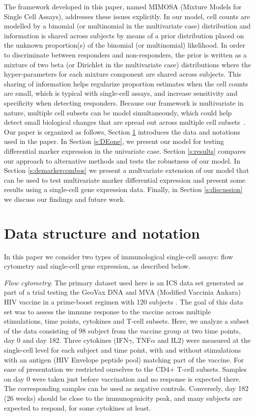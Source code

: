 \documentclass[useAMS,referee,usenatbib]{biom}
\begin{document}
The framework developed in this paper, named MIMOSA (Mixture Models for Single Cell Assays), addresses these issues explicitly. In our model, cell counts are modelled by a binomial (or multinomial in the multivariate case) distribution and information is shared across subjects by means of a prior distribution placed on the unknown proportion(s) of the binomial (or multinomial) likelihood. 
In order to discriminate between responders and non-responders, the prior is written as a mixture of two beta (or Dirichlet in the multivariate case) distributions where the hyper-parameters for each mixture component are shared across subjects. 
This sharing of information helps regularize proportion estimates when the cell counts are small, which is typical with single-cell assays, and increase sensitivity and specificity when detecting responders. 
Because our framework is multivariate in nature, multiple cell subsets can be model simultaneously, which could help detect small biological changes that are spread out across multiple cell subsets~\citep{Nason:2006dx}. Our paper is organized as follows, Section \ref{s:data} introduces the data and notations used in the paper. In Section \ref{s:DEone}, we present our model for testing differential marker expression in the univariate case. Section \ref{s:results} compares our approach to alternative methods and tests the robustness of our model. In Section \ref{s:demarkercombos} we present a multvariate extension of our model that can be used to test multivariate marker differential expression and present some results using a single-cell gene expression data. Finally, in Section \ref{s:discussion} we discuss our findings and future work.

\section{Data structure and notation} 
\label{s:data}
In this paper we consider two types of immunological single-cell assays: flow cytometry and single-cell gene expression, as described below.

\textit{Flow cytometry}:
The primary dataset used here is an ICS data set generated as part of a  trial testing the GeoVax DNA and MVA (Modified Vaccinia Ankara) HIV vaccine in a prime-boost regimen with 120 subjects \citep{Goepfert:2011ci}. 
The goal of this data set was to assess the immune response to the vaccine across multiple stimulations, time points, cytokines and T-cell subsets. 
Here, we analyze a subset of the data consisting of 98 subject from the vaccine group at two time points, day 0 and day 182. 
Three cytokines (IFN$\gamma$, TNF$\alpha$ and IL2) were measured at the single-cell level for each subject and time point, with and without stimulations with an antigen (HIV Envelope peptide pool) matching part of the vaccine. For ease of presentation we restricted ourselves to the CD4+ T-cell subsets. Samples on day 0 were taken just before vaccination and no response is expected there. The corresponding samples can be used as negative controls. Conversely, day 182 (26 weeks) should be close to the immunogenicity peak, and many subjects are expected to respond, for some cytokines at least. 
\end{document}
